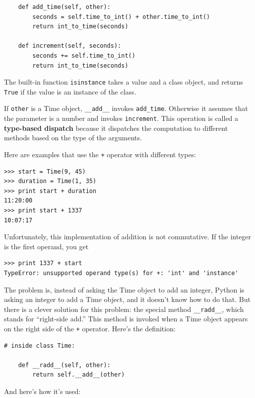 \documentclass[10pt]{book}
\begin{document}
{\begin{verbatim}
    def add_time(self, other):
        seconds = self.time_to_int() + other.time_to_int()
        return int_to_time(seconds)

    def increment(self, seconds):
        seconds += self.time_to_int()
        return int_to_time(seconds)
\end{verbatim}
\afterverb
%
The built-in function {\tt isinstance} takes a value and a
class object, and returns {\tt True} if the value is an instance
of the class.


If {\tt other} is a Time object, \verb"__add__" invokes
\verb"add_time".  Otherwise it assumes that the parameter
is a number and invokes {\tt increment}.  This operation is
called a {\bf type-based dispatch} because it dispatches the
computation to different methods based on the type of the
arguments.


Here are examples that use the {\tt +} operator with different
types:

\beforeverb
\begin{verbatim}
>>> start = Time(9, 45)
>>> duration = Time(1, 35)
>>> print start + duration
11:20:00
>>> print start + 1337
10:07:17
\end{verbatim}
\afterverb
%
Unfortunately, this implementation of addition is not commutative.
If the integer is the first operand, you get


\beforeverb
\begin{verbatim}
>>> print 1337 + start
TypeError: unsupported operand type(s) for +: 'int' and 'instance'
\end{verbatim}
\afterverb
%
The problem is, instead of asking the Time object to add an integer,
Python is asking an integer to add a Time object, and it doesn't know
how to do that.  But there is a clever solution for this problem: the
special method \verb"__radd__", which stands for ``right-side add.''
This method is invoked when a Time object appears on the right side of
the {\tt +} operator.  Here's the definition:


\beforeverb
\begin{verbatim}
# inside class Time:

    def __radd__(self, other):
        return self.__add__(other)
\end{verbatim}
\afterverb
%
And here's how it's used:

}
\end{document}
